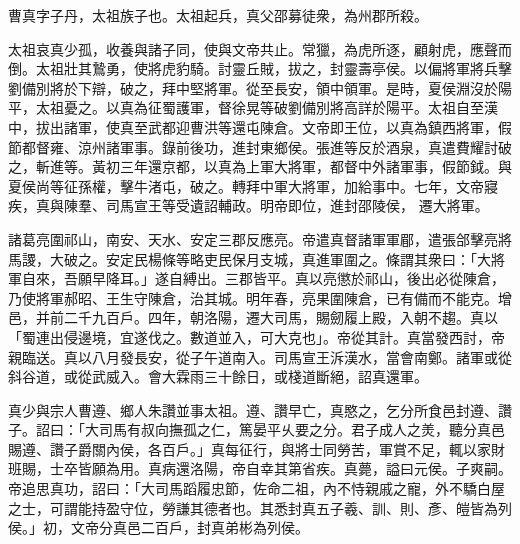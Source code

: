 \begin{pinyinscope}
 
 
 曹真字子丹，太祖族子也。太祖起兵，真父邵募徒衆，為州郡所殺。
 
 
 太祖哀真少孤，收養與諸子同，使與文帝共止。常獵，為虎所逐，顧射虎，應聲而倒。太祖壯其鷙勇，使將虎豹騎。討靈丘賊，拔之，封靈壽亭侯。以偏將軍將兵擊劉備別將於下辯，破之，拜中堅將軍。從至長安，領中領軍。是時，夏侯淵沒於陽平，太祖憂之。以真為征蜀護軍，督徐晃等破劉備別將高詳於陽平。太祖自至漢中，拔出諸軍，使真至武都迎曹洪等還屯陳倉。文帝即王位，以真為鎮西將軍，假節都督雍、涼州諸軍事。錄前後功，進封東鄉侯。張進等反於酒泉，真遣費耀討破之，斬進等。黃初三年還京都，以真為上軍大將軍，都督中外諸軍事，假節鉞。與夏侯尚等征孫權，擊牛渚屯，破之。轉拜中軍大將軍，加給事中。七年，文帝寢疾，真與陳羣、司馬宣王等受遺詔輔政。明帝即位，進封邵陵侯，
 遷大將軍。
 
 
 
 
 諸葛亮圍祁山，南安、天水、安定三郡反應亮。帝遣真督諸軍軍郿，遣張郃擊亮將馬謖，大破之。安定民楊條等略吏民保月支城，真進軍圍之。條謂其衆曰：「大將軍自來，吾願早降耳。」遂自縛出。三郡皆平。真以亮懲於祁山，後出必從陳倉，乃使將軍郝昭、王生守陳倉，治其城。明年春，亮果圍陳倉，已有備而不能克。增邑，并前二千九百戶。四年，朝洛陽，遷大司馬，賜劒履上殿，入朝不趨。真以「蜀連出侵邊境，宜遂伐之。數道並入，可大克也」。帝從其計。真當發西討，帝親臨送。真以八月發長安，從子午道南入。司馬宣王泝漢水，當會南鄭。諸軍或從斜谷道，或從武威入。會大霖雨三十餘日，或棧道斷絕，詔真還軍。
 
 
 
 
 真少與宗人曹遵、鄉人朱讚並事太祖。遵、讚早亡，真愍之，乞分所食邑封遵、讚子。詔曰：「大司馬有叔向撫孤之仁，篤晏平乆要之分。君子成人之羙，聽分真邑賜遵、讚子爵關內侯，各百戶。」真每征行，與將士同勞苦，軍賞不足，輒以家財班賜，士卒皆願為用。真病還洛陽，帝自幸其第省疾。真薨，謚曰元侯。子爽嗣。帝追思真功，詔曰：「大司馬蹈履忠節，佐命二祖，內不恃親戚之寵，外不驕白屋之士，可謂能持盈守位，勞謙其德者也。其悉封真五子羲、訓、則、彥、皚皆為列侯。」初，文帝分真邑二百戶，封真弟彬為列侯。
 
 
\end{pinyinscope}